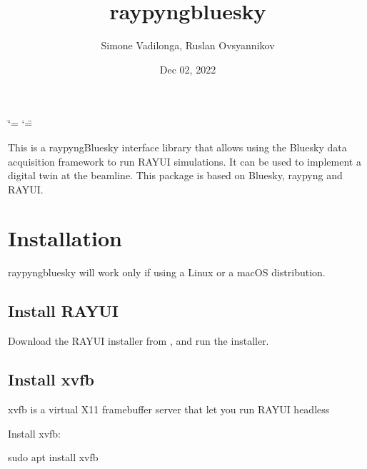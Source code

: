 \documentclass[letterpaper,10pt,english]{sphinxmanual}
\title{raypyng\sphinxhyphen{}bluesky}
\date{Dec 02, 2022}
\author{Simone Vadilonga, Ruslan Ovsyannikov}
\begin{document}
\ifdefined\shorthandoff
  \ifnum\catcode`\=\string=\active\shorthandoff{=}\fi
  \ifnum\catcode`\"=\active{}\fi
\fi

\pagestyle{empty}
\sphinxmaketitle
\pagestyle{plain}
\sphinxtableofcontents
\pagestyle{normal}
\label{\detokenize{index::doc}}


\sphinxAtStartPar
This is a raypyng\sphinxhyphen{}Bluesky interface library that allows using the Bluesky data acquisition framework to run RAY\sphinxhyphen{}UI simulations.
It can be used to implement a digital twin at the beamline.
This package is based on Bluesky, raypyng and RAY\sphinxhyphen{}UI.

\sphinxAtStartPar
{}

\sphinxstepscope


\chapter{Installation}
\label{\detokenize{installation:installation}}\label{\detokenize{installation::doc}}
\sphinxAtStartPar
raypyng\sphinxhyphen{}bluesky will work only if using a Linux or a macOS distribution.


\section{Install RAY\sphinxhyphen{}UI}
\label{\detokenize{installation:install-ray-ui}}
\sphinxAtStartPar
Download the RAY\sphinxhyphen{}UI installer from  ,
and run the installer.


\section{Install xvfb}
\label{\detokenize{installation:install-xvfb}}
\sphinxAtStartPar
xvfb is a virtual X11 framebuffer server that let you run RAY\sphinxhyphen{}UI headless

\sphinxAtStartPar
Install xvfb:

\begin{sphinxVerbatim}[commandchars=\\\{\}]
sudo apt install xvfb
\end{sphinxVerbatim}
\end{document}
